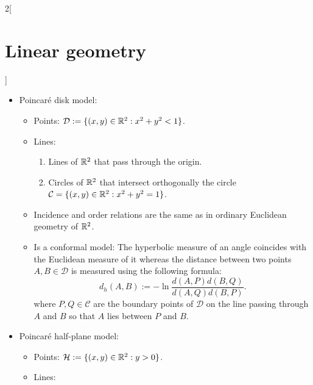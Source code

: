 \documentclass[../../../main.tex]{subfiles}
\begin{document}
\begin{multicols}{2}[\section{Linear geometry}]
\begin{definition}
\begin{itemize}
\begin{center}
\begin{minipage}{\linewidth}
                      \end{minipage}
                  \end{center}
            \item Poincaré disk model:
                  \begin{itemize}
                      \item Points: $\mathcal{D}:=\{(x,y)\in\mathbb{R}^2:x^2+y^2<1\}$.
                      \item Lines:
                            \begin{enumerate}
                                \item Lines of $\mathbb{R}^2$ that pass through the origin.
                                \item Circles of $\mathbb{R}^2$ that intersect orthogonally the circle $\mathcal{C}=\{(x,y)\in\mathbb{R}^2:x^2+y^2=1\}$.
                            \end{enumerate}
                      \item Incidence and order relations are the same as in ordinary Euclidean geometry of $\mathbb{R}^2$.
                      \item Is a conformal model: The hyperbolic measure of an angle coincides with the Euclidean measure of it whereas the distance between two points $A,B\in\mathcal{D}$ is measured using the following formula: $$d_h(A,B):=-\ln\frac{d(A,P)d(B,Q)}{d(A,Q)d(B,P)}.$$ where $P,Q\in\mathcal{C}$ are the boundary points of $\mathcal{D}$ on the line passing through $A$ and $B$ so that $A$ lies between $P$ and $B$.
                  \end{itemize}
                  \begin{center}
                      \begin{minipage}{\linewidth}
                          \centering
                          
                      \end{minipage}
                  \end{center}
            \item Poincaré half-plane model:
                  \begin{itemize}
                      \item Points: $\mathcal{H}:=\{(x,y)\in\mathbb{R}^2:y>0\}$.
                      \item Lines:
                            \begin{enumerate}

\end{enumerate}
\end{itemize}
\end{itemize}
\end{definition}
\end{multicols}
\end{document}
